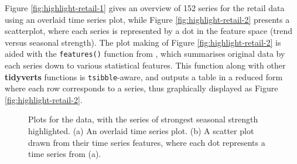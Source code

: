 Figure \ref{fig:highlight-retail-1} gives an overview of 152 series for
the retail data using an overlaid time series plot, while Figure
\ref{fig:highlight-retail-2} presents a scatterplot, where each series
is represented by a dot in the feature space (trend versus seasonal
strength). The plot making of Figure \ref{fig:highlight-retail-2} is
aided with the \texttt{features()} function from , which
summarises original data by each series down to various statistical
features. This function along with other \textbf{tidyverts} functions is
\texttt{tsibble}-aware, and outputs a table in a reduced form where each
row corresponds to a series, thus graphically displayed as Figure
\ref{fig:highlight-retail-2}.

\begin{Schunk}
\begin{figure}

{\centering {}

}

\caption[Plots for the  data, with the series of strongest seasonal strength highlighted]{Plots for the  data, with the series of strongest seasonal strength highlighted. (a) An overlaid time series plot. (b) A scatter plot drawn from their time series features, where each dot represents a time series from (a).}\label{fig:highlight-retail}
\end{figure}
\end{Schunk}

